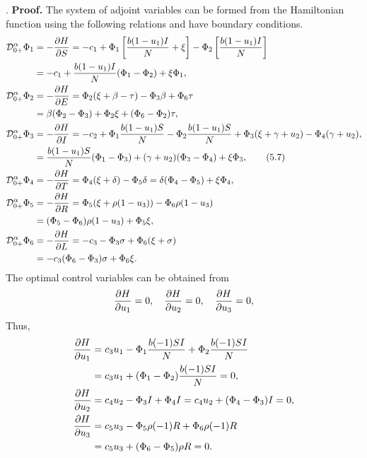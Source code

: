 \documentclass[10pt]{NSP1}
\newcommand{\CD}{\mathcal{D}}
\begin{document}
.
	\textbf{Proof.} The system of adjoint variables can be formed from the Hamiltonian function using the following relations and have boundary conditions.
	\begin{align}
		\CD_{0+}^{\alpha} \Phi_1 &= -\frac{\partial H}{\partial S} = -c_1 + \Phi_1 \left[ \frac{b (1-u_1) I}{N} + \xi \right] - \Phi_2 \left[ \frac{b (1-u_1) I}{N} \right] \notag \\
		&= -c_1 + \frac{b (1-u_1) I}{N} (\Phi_1 - \Phi_2) + \xi \Phi_1, \notag\\
		\CD_{0+}^{\alpha} \Phi_2 &= -\frac{\partial H}{\partial E} = \Phi_2 (\xi + \beta - \tau) - \Phi_3 \beta + \Phi_6 \tau \notag \notag\\
		&= \beta(\Phi_2 - \Phi_3) + \Phi_2 \xi + (\Phi_6 - \Phi_2) \tau, \notag\\
		\CD_{0+}^{\alpha} \Phi_3 &= -\frac{\partial H}{\partial I} = -c_2 + \Phi_1 \frac{b (1-u_1) S}{N} - \Phi_2 \frac{b (1-u_1) S}{N} + \Phi_3 (\xi + \gamma + u_2) - \Phi_4 (\gamma + u_2), \notag \\
		&= \frac{b (1-u_1) S}{N} (\Phi_1 - \Phi_3) + (\gamma + u_2)(\Phi_3 - \Phi_4) + \xi \Phi_3, \tag{5.7} \\
		\CD_{0+}^{\alpha} \Phi_4 &= -\frac{\partial H}{\partial T} = \Phi_4 (\xi + \delta) - \Phi_5 \delta = \delta(\Phi_4 - \Phi_5) + \xi \Phi_4, \notag \\
		\CD_{0+}^{\alpha} \Phi_5 &= -\frac{\partial H}{\partial R} = \Phi_5 (\xi + \rho(1-u_3)) - \Phi_6 \rho(1-u_3) \notag \\
		&= (\Phi_5 - \Phi_6) \rho(1-u_3) + \Phi_5 \xi, \notag \\
		\CD_{0+}^{\alpha} \Phi_6 &= -\frac{\partial H}{\partial L} = -c_3 - \Phi_3 \sigma + \Phi_6 (\xi + \sigma) \notag \\
		&= -c_3 (\Phi_6 - \Phi_3) \sigma + \Phi_6 \xi. \notag
	\end{align}
	The optimal control variables can be obtained from
	\begin{equation}
		\frac{\partial H}{\partial u_1} = 0, \quad \frac{\partial H}{\partial u_2} = 0, \quad \frac{\partial H}{\partial u_3} = 0,\notag
	\end{equation}
	Thus,
	\begin{align}
		\frac{\partial H}{\partial u_1} &= c_3 u_1 - \Phi_1 \frac{b (-1) S I}{N} + \Phi_2 \frac{b (-1) S I}{N} \notag \\
		&= c_3 u_1 + (\Phi_1 - \Phi_2) \frac{b (-1) S I}{N} = 0, \notag \\
		\frac{\partial H}{\partial u_2} &= c_4 u_2 - \Phi_3 I + \Phi_4 I = c_4 u_2 + (\Phi_4 - \Phi_3) I = 0, \notag \\
		\frac{\partial H}{\partial u_3} &= c_5 u_3 - \Phi_5 \rho(-1) R + \Phi_6 \rho(-1) R \notag \\
		&= c_5 u_3 + (\Phi_6 - \Phi_5) \rho R = 0. \notag
	\end{align}
	
\end{document}
